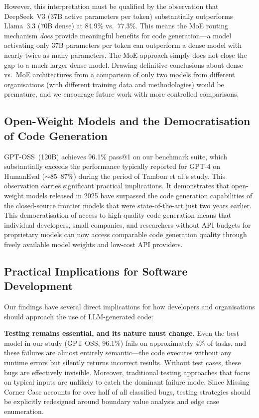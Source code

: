 \documentclass[smallextended]{svjour3}
\begin{document}
However, this interpretation must be qualified by the observation that DeepSeek~V3 (37B active parameters per token) substantially outperforms Llama~3.3 (70B dense) at 84.9\% vs.\ 77.3\%. This means the MoE routing mechanism \emph{does} provide meaningful benefits for code generation---a model activating only 37B parameters per token can outperform a dense model with nearly twice as many parameters. The MoE approach simply does not close the gap to a much larger dense model. Drawing definitive conclusions about dense vs.\ MoE architectures from a comparison of only two models from different organisations (with different training data and methodologies) would be premature, and we encourage future work with more controlled comparisons.

\subsection{Open-Weight Models and the Democratisation of Code Generation}

GPT-OSS~(120B) achieves 96.1\% pass@1 on our benchmark suite, which substantially exceeds the performance typically reported for GPT-4 on HumanEval (${\sim}85$--$87\%$) during the period of Tambon et al.'s study. This observation carries significant practical implications. It demonstrates that open-weight models released in 2025 have surpassed the code generation capabilities of the closed-source frontier models that were state-of-the-art just two years earlier. This democratisation of access to high-quality code generation means that individual developers, small companies, and researchers without API budgets for proprietary models can now access comparable code generation quality through freely available model weights and low-cost API providers.

\subsection{Practical Implications for Software Development}

Our findings have several direct implications for how developers and organisations should approach the use of LLM-generated code:

\textbf{Testing remains essential, and its nature must change.} Even the best model in our study (GPT-OSS, 96.1\%) fails on approximately 4\% of tasks, and these failures are almost entirely semantic---the code executes without any runtime errors but silently returns incorrect results. Without test cases, these bugs are effectively invisible. Moreover, traditional testing approaches that focus on typical inputs are unlikely to catch the dominant failure mode. Since Missing Corner Case accounts for over half of all classified bugs, testing strategies should be explicitly redesigned around boundary value analysis and edge case enumeration.
\end{document}
